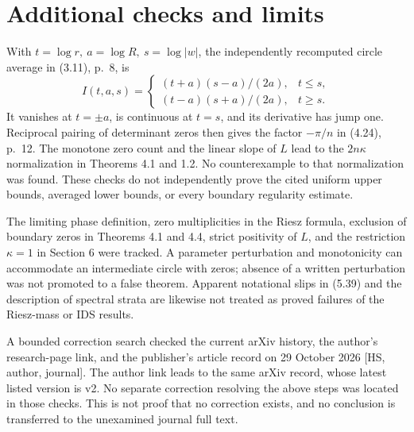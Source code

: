 \documentclass[10pt]{article}
\begin{document}
\section*{Additional checks and limits}
With \(t=\log r,\ a=\log R,\ s=\log|w|\), the independently recomputed circle average in (3.11), p. 8, is \[I(t,a,s)=
 \begin{cases}
 (t+a)(s-a)/(2a),&t\le s,\\
 (t-a)(s+a)/(2a),&t\ge s.
 \end{cases}\] It vanishes at \(t=\pm a\), is continuous at \(t=s\), and its derivative has jump one. Reciprocal pairing of determinant zeros then gives the factor \(-\pi/n\) in (4.24), p. 12. The monotone zero count and the linear slope of \(L\) lead to the \(2n\kappa\) normalization in Theorems 4.1 and 1.2. No counterexample to that normalization was found. These checks do not independently prove the cited uniform upper bounds, averaged lower bounds, or every boundary regularity estimate.\par
The limiting phase definition, zero multiplicities in the Riesz formula, exclusion of boundary zeros in Theorems 4.1 and 4.4, strict positivity of \(L\), and the restriction \(\kappa=1\) in Section 6 were tracked. A parameter perturbation and monotonicity can accommodate an intermediate circle with zeros; absence of a written perturbation was not promoted to a false theorem. Apparent notational slips in (5.39) and the description of spectral strata are likewise not treated as proved failures of the Riesz-mass or IDS results.\par
A bounded correction search checked the current arXiv history, the author’s research-page link, and the publisher’s article record on 29 October 2026 [HS, author, journal]. The author link leads to the same arXiv record, whose latest listed version is v2. No separate correction resolving the above steps was located in those checks. This is not proof that no correction exists, and no conclusion is transferred to the unexamined journal full text.\par
\end{document}
